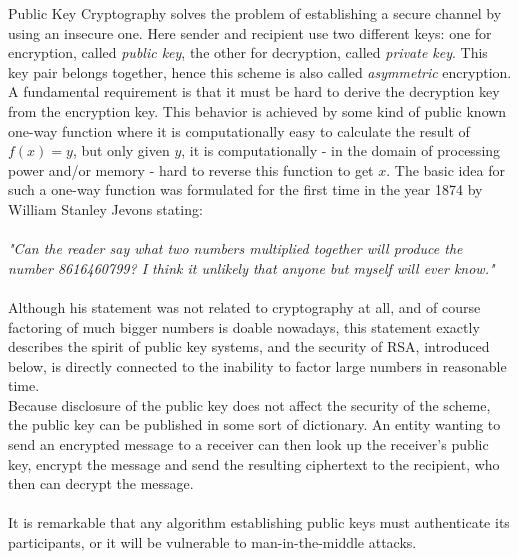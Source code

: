 Public Key Cryptography solves the problem of establishing a secure channel by using an insecure one.
Here sender and recipient use two different keys: one for encryption, called \textit{public key}, the other
for decryption, called \textit{private key}. This key pair belongs together, hence this scheme is also called \textit{asymmetric} encryption. A fundamental requirement
is that it must be hard
to derive the decryption key from the encryption key. This behavior is achieved by some kind of public known one-way function where it is computationally
easy to calculate the result of $f(x) = y$, but only given $y$, it is computationally - in the domain of processing power and/or memory - hard
to reverse this function to get $x$.
The basic idea for such a one-way function was formulated for the first time in the year 1874 by William Stanley Jevons stating:
\\
\\
\textit{"Can the reader say what two numbers multiplied together will produce the number 8616460799? I think it unlikely that anyone but myself will
ever know."} \cite{wStanley} 
\\
\\
Although his statement was not related to cryptography at all, and of course factoring of much bigger numbers is doable nowadays, this statement exactly describes
the spirit of public key systems, and the security of RSA, introduced below, is directly connected to the inability to factor large numbers in reasonable time.
\\
Because disclosure of the public key does not affect the security of the scheme, the public key can be published in some sort of dictionary.
An entity wanting to send an encrypted message to a receiver can then look up the receiver's public key, encrypt the message and send the resulting
ciphertext to the recipient, who then can decrypt the message. 
\\
\\
It is remarkable that any algorithm establishing public keys must authenticate its participants, or it will be vulnerable to man-in-the-middle attacks.

